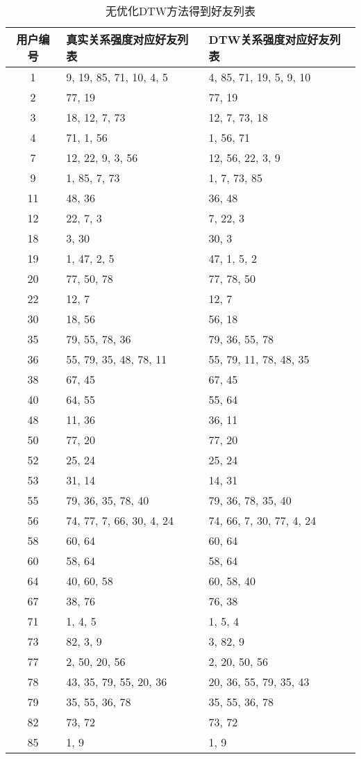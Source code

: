 \begin{table}[htbp]
  \centering
  \caption[无优化DTW方法得到好友列表]{无优化DTW方法得到好友列表}
  \label{tab:dtwResult}
    \begin{tabular}{cll}%
      \toprule[1.5pt]
      用户编号 & 真实关系强度对应好友列表 & DTW关系强度对应好友列表\\
      \midrule[1pt]
      1 & 9, 19, 85, 71, 10, 4, 5 & 4, 85, 71, 19, 5, 9, 10\\
      2 & 77, 19 & 77, 19\\
      3 & 18, 12, 7, 73 & 12, 7, 73, 18\\
      4 & 71, 1, 56 & 1, 56, 71\\
      7 & 12, 22, 9, 3, 56 & 12, 56, 22, 3, 9\\
      9 & 1, 85, 7, 73 & 1, 7, 73, 85\\
      11 & 48, 36 & 36, 48\\
      12 & 22, 7, 3 & 7, 22, 3\\
      18 & 3, 30 & 30, 3\\
      19 & 1, 47, 2, 5 & 47, 1, 5, 2\\
      20 & 77, 50, 78 & 77, 78, 50\\
      22 & 12, 7 & 12, 7\\
      30 & 18, 56 & 56, 18\\
      35 & 79, 55, 78, 36 & 79, 36, 55, 78\\
      36 & 55, 79, 35, 48, 78, 11 & 55, 79, 11, 78, 48, 35\\
      38 & 67, 45 & 67, 45\\
      40 & 64, 55 & 55, 64\\
      48 & 11, 36 & 36, 11\\
      50 & 77, 20 & 77, 20\\
      52 & 25, 24 & 25, 24\\
      53 & 31, 14 & 14, 31\\
      55 & 79, 36, 35, 78, 40 & 79, 36, 78, 35, 40\\
      56 & 74, 77, 7, 66, 30, 4, 24 & 74, 66, 7, 30, 77, 4, 24\\
      58 & 60, 64 & 60, 64\\
      60 & 58, 64 & 58, 64\\
      64 & 40, 60, 58 & 60, 58, 40\\
      67 & 38, 76 & 76, 38\\
      71 & 1, 4, 5 & 1, 5, 4\\
      73 & 82, 3, 9 & 3, 82, 9\\
      77 & 2, 50, 20, 56 & 2, 20, 50, 56\\
      78 & 43, 35, 79, 55, 20, 36 & 20, 36, 55, 79, 35, 43\\
      79 & 35, 55, 36, 78 & 35, 55, 36, 78\\
      82 & 73, 72 & 73, 72\\
      85 & 1, 9 & 1, 9\\
      \bottomrule[1.5pt]
    \end{tabular}
\end{table}
